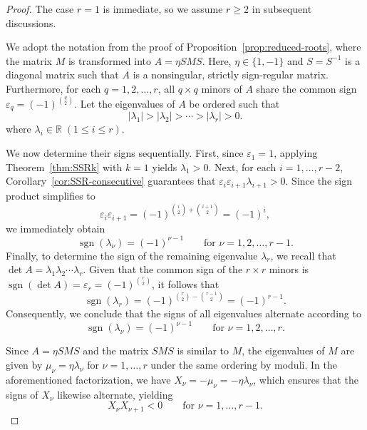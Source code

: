 \documentclass[preprint,3p,10pt]{elsarticle}
\newcommand{\R}{\mathbb R}
\theoremstyle{definition}
\begin{document}
\begin{proof}
The case \(r=1\) is immediate, so we assume \(r\ge2\) in subsequent discussions.

We adopt the notation from the proof of Proposition~\ref{prop:reduced-roots}, where the matrix $M$ is transformed into $A = \eta SMS$. Here, $\eta \in \{1, -1\}$ and $S = S^{-1}$ is a diagonal matrix such that $A$ is a nonsingular, strictly sign-regular matrix. Furthermore, for each $q = 1, 2, \ldots, r$, all $q \times q$ minors of $A$ share the common sign $\varepsilon_q = (-1)^{\binom{q}{2}}$. Let the eigenvalues of $A$ be ordered such that
\begin{equation}
    |\lambda_1| > |\lambda_2| > \cdots > |\lambda_r| > 0.
\end{equation}
where $\lambda_i \in \R \; (1\le i \le r).$

We now determine their signs sequentially. First, since $\varepsilon_1 = 1$, applying Theorem~\ref{thm:SSRk} with $k = 1$ yields $\lambda_1 > 0$. Next, for each $i = 1, \ldots, r - 2$, Corollary~\ref{cor:SSR-consecutive} guarantees that $\varepsilon_i \varepsilon_{i+1} \lambda_{i+1} > 0$. Since the sign product simplifies to
\begin{equation}
    \varepsilon_i \varepsilon_{i+1} = (-1)^{\binom{i}{2} + \binom{i+1}{2}} = (-1)^i,
\end{equation}
we immediately obtain
\begin{equation}
    \operatorname{sgn}(\lambda_\nu) = (-1)^{\nu-1} \qquad \text{for } \nu = 1,2, \ldots, r - 1.
\end{equation}
Finally, to determine the sign of the remaining eigenvalue $\lambda_r$, we recall that $\det A=\lambda_1 \lambda_2 \cdots \lambda_r $. Given that the common sign of the $r \times r$ minors is $\operatorname{sgn}(\det A) = \varepsilon_r = (-1)^{\binom{r}{2}}$, it follows that
\begin{equation}
    \operatorname{sgn}(\lambda_r) =  (-1)^{\binom{r}{2}-\binom{r-1}{2}} = (-1)^{r-1}.
\end{equation}
Consequently, we conclude that the signs of all eigenvalues alternate according to
\begin{equation}
    \operatorname{sgn}(\lambda_\nu) = (-1)^{\nu-1} \qquad \text{for } \nu = 1,2, \ldots, r.
\end{equation}

Since $A = \eta SMS$ and the matrix $SMS$ is similar to $M$, the eigenvalues of $M$ are given by $\mu_\nu = \eta \lambda_\nu$ for $\nu = 1, \ldots, r$ under the same ordering by moduli. In the aforementioned factorization, we have $X_\nu = -\mu_\nu = -\eta \lambda_\nu$, which ensures that the signs of $X_\nu$ likewise alternate, yielding
\begin{equation}
    X_\nu X_{\nu+1} < 0 \qquad \text{for } \nu = 1, \ldots, r-1.
\end{equation}



\end{proof}
\end{document}
